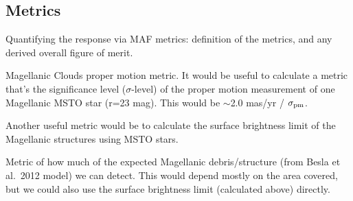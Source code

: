 \begin{enumerate}
  

\end{enumerate}


\subsection{Metrics}
\label{sec:keyword:metrics}

Quantifying the response via MAF metrics: definition of the metrics,
and any derived overall figure of merit.


\item  Magellanic Clouds proper motion metric.
It would be useful to calculate a metric that's the significance level ($\sigma$-level) of the proper motion measurement of one Magellanic MSTO star (r=23 mag).
This would be $\sim$2.0 mas/yr / $\sigma_{\rm pm}$.

\item Another useful metric would be to calculate the surface brightness limit of the Magellanic structures using MSTO stars.

\item Metric of how much of the expected Magellanic debris/structure (from Besla et al.\ 2012 model) we can detect.  This would depend mostly
on the area covered, but we could also use the surface brightness limit (calculated above) directly.




